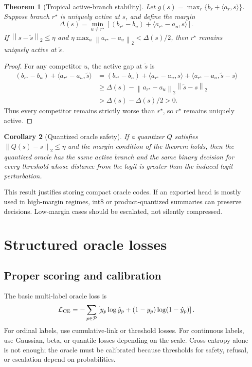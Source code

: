 \documentclass[11pt]{article}
\newtheorem{theorem}{Theorem}[section]
\newtheorem{corollary}[theorem]{Corollary}
\theoremstyle{definition}
\theoremstyle{remark}
\newcommand{\loss}{\mathcal{L}}
\newcommand{\Prop}{\mathcal{P}}
\newcommand{\norm}[1]{\left\lVert #1\right\rVert}
\numberwithin{equation}{section}
\begin{document}
\begin{theorem}[Tropical active-branch stability]
Let \(g(s)=\max_r\{b_r+\langle a_r,s\rangle\}\).  Suppose branch \(r^\star\) is uniquely active at \(s\), and define the margin
\begin{equation}
    \Delta(s)=\min_{u\ne r^\star}\left[(b_{r^\star}-b_u)+\langle a_{r^\star}-a_u,s\rangle\right].
\end{equation}
If \(\norm{s-\tilde s}_2\le \eta\) and \(\eta\max_u\norm{a_{r^\star}-a_u}_2 < \Delta(s)/2\), then \(r^\star\) remains uniquely active at \(\tilde s\).
\end{theorem}
\begin{proof}
For any competitor \(u\), the active gap at \(\tilde s\) is
\begin{align}
(b_{r^\star}-b_u)+\langle a_{r^\star}-a_u,\tilde s\rangle
&=(b_{r^\star}-b_u)+\langle a_{r^\star}-a_u,s\rangle+\langle a_{r^\star}-a_u,\tilde s-s\rangle\\
&\ge \Delta(s)-\norm{a_{r^\star}-a_u}_2\norm{\tilde s-s}_2\\
&>\Delta(s)-\Delta(s)/2>0.
\end{align}
Thus every competitor remains strictly worse than \(r^\star\), so \(r^\star\) remains uniquely active.
\end{proof}

\begin{corollary}[Quantized oracle safety]
If a quantizer \(Q\) satisfies \(\norm{Q(s)-s}_2\le\eta\) and the margin condition of the theorem holds, then the quantized oracle has the same active branch and the same binary decision for every threshold whose distance from the logit is greater than the induced logit perturbation.
\end{corollary}

This result justifies storing compact oracle codes.  If an exported head is mostly used in high-margin regimes, int8 or product-quantized summaries can preserve decisions.  Low-margin cases should be escalated, not silently compressed.

\section{Structured oracle losses}

\subsection{Proper scoring and calibration}

The basic multi-label oracle loss is
\begin{equation}
    \loss_{\rm CE}= -\sum_{p\in\Prop}\left[y_p\log \hat y_p+(1-y_p)\log(1-\hat y_p)\right].
\end{equation}
For ordinal labels, use cumulative-link or threshold losses.  For continuous labels, use Gaussian, beta, or quantile losses depending on the scale.  Cross-entropy alone is not enough; the oracle must be calibrated because thresholds for safety, refusal, or escalation depend on probabilities.
\end{document}
